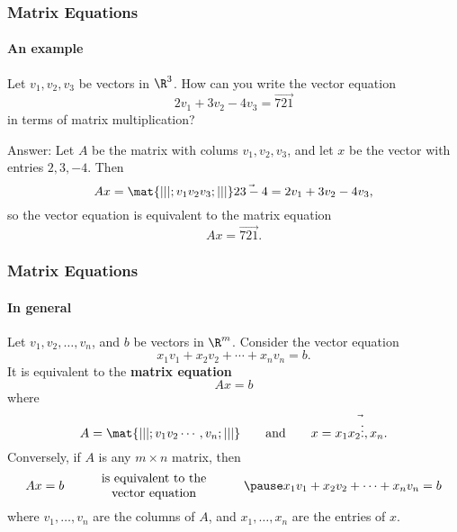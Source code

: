
\begin{frame}
\frametitle{Matrix Equations}
\framesubtitle{An example}

\vskip-3mm
\begin{ques}
  Let $v_1,v_2,v_3$ be vectors in $\R^3$.
  \pause
  How can you write the vector equation
  \[ 2v_1 + 3v_2 - 4v_3 = \vec{7 2 1} \]
  in terms of matrix multiplication?
\end{ques}

\begin{webonly}
  \medskip
  \alert{Answer:}
  Let $A$ be the matrix with colums $v_1,v_2,v_3$, and let $x$ be the vector
  with entries $2,3,-4$.  Then
  \[ Ax = \mat{ | | |; v_1 v_2 v_3; | | |}\vec{2 3 -4}
  = 2v_1 + 3v_2 - 4v_3, \]
  so the vector equation is equivalent to the matrix equation
  \[ Ax = \vec{7 2 1}. \]
\end{webonly}

\end{frame}



\begin{frame}
\frametitle{Matrix Equations}
\framesubtitle{In general}

Let $v_1,v_2,\ldots,v_n$, and $b$ be vectors in $\R^m$. 
\pause
Consider the vector equation
\[ x_1v_1 + x_2v_2 + \cdots + x_nv_n = b. \]
\pause
It is equivalent to the \textbf{matrix equation}
\[ Ax = b \]
where
\pause
\[ A = \mat{ | | {} |; v_1 v_2 \cdots, v_n; | | {} |} 
\qquad\text{and}\qquad
x = \vec{x_1 x_2 \vdots, x_n}. \]
\pause
Conversely, if $A$ is any $m\times n$ matrix, then
\[ Ax = b 
\qquad \parbox{.3\textwidth}{\centering is equivalent to the vector equation}
\qquad
\pause
x_1v_1 + x_2v_2 + \cdots + x_nv_n = b \]
\pause
where $v_1,\ldots,v_n$ are
\pause 
the columns of $A$, and $x_1,\ldots,x_n$ are 
\pause
the entries of $x$.

\end{frame}




